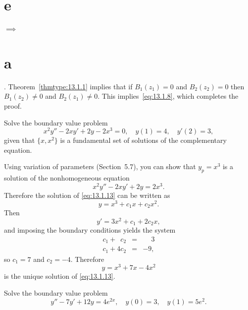\part{e} $\implies$ \part{a}. Theorem~\ref{thmtype:13.1.1} implies that if $B_{1}(z_{1})=0$ and
$B_{2}(z_{2})=0$ then $B_{1}(z_{2})\ne0$ and $B_{2}(z_{1})\ne0$. This implies~\eqref{eq:13.1.8},
which completes the proof.

\begin{example}
  \label{example:13.1.4} \rm Solve the boundary value problem
  \begin{equation}
    \label{eq:13.1.13}x^{2}y''-2xy'+2y-2x^{3}=0,\quad y(1)=4,\quad y'(2)=3,
  \end{equation}
  given that $\{x,x^{2}\}$ is a fundamental set of solutions of the complementary equation. \end{example}

\begin{examplesolution}
\solution Using variation of parameters (Section~5.7), you can show that $y_{p}=x^{3}$ is a solution
of the nonhomogeneous equation
\[
  x^{2}y''-2xy'+2y=2x^{3}.
\]
Therefore the solution of \eqref{eq:13.1.13} can be written as
\[
  y=x^{3}+c_{1}x+c_{2}x^{2}.
\]
Then
\[
  y'=3x^{2}+c_{1}+2c_{2}x,
\]
and imposing the boundary conditions yields the system
\begin{eqnarray*}
  c_{1}+\phantom{4}c_{2} & = & \phantom{-}3 \\
  c_{1}+4c_{2}           & = & -9,
\end{eqnarray*}
so $c_{1}=7$ and $c_{2}=-4$. Therefore
\[
  y=x^{3}+7x-4x^{2}
\]
is the unique solution of \eqref{eq:13.1.13}.
\end{examplesolution}

\begin{example}
  \label{example:13.1.5} \rm Solve the boundary value problem
  \[
    y''-7y'+12y=4e^{2x},\quad y(0)=3,\quad y(1)=5e^{2}.
  \]
\end{example}

